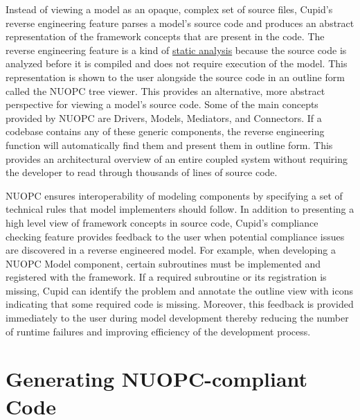 \documentclass[oneside,11pt]{memoir}
\begin{document}
Instead of viewing a model as an opaque, complex set of source files, Cupid's reverse engineering feature parses a model's source code and produces an abstract representation of the framework concepts that are present in the code. The reverse engineering feature is a kind of \href{http://en.wikipedia.org/wiki/Static_program_analysis}{static analysis} because the source code is analyzed before it is compiled and does not require execution of the model.  This representation is shown to the user alongside the source code in an outline form called the NUOPC tree viewer. This provides an alternative, more abstract perspective for viewing a model’s source code. Some of the main concepts provided by NUOPC are Drivers, Models, Mediators, and Connectors. If a codebase contains any of these generic components, the reverse engineering function will automatically find them and present them in outline form. This provides an architectural overview of an entire coupled system without requiring the developer to read through thousands of lines of source code.

NUOPC ensures interoperability of modeling components by specifying a set of technical rules that model implementers should follow.  In addition to presenting a high level view of framework concepts in source code, Cupid’s compliance checking feature provides feedback to the user when potential compliance issues are discovered in a reverse engineered model. For example, when developing a NUOPC Model component, certain subroutines must be implemented and registered with the framework. If a required subroutine or its registration is missing, Cupid can identify the problem and annotate the outline view with icons indicating that some required code is missing. Moreover, this feedback is provided immediately to the user during model development thereby reducing the number of runtime failures and improving efficiency of the development process.


\chapter{Generating NUOPC-compliant Code}
\end{document}
